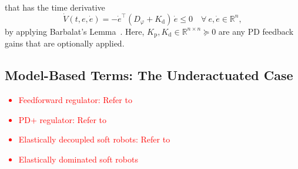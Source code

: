 that has the time derivative
\begin{equation}
    \dot{V}(t,e,\dot{e}) = -\dot{e}^\top \left (D_\varphi + K_\mathrm{d} \right ) \, \dot{e} \leq 0 \quad \forall \: e,\dot{e} \in \mathbb{R}^n,
\end{equation}
by applying Barbalat's Lemma~\citep{slotine1991applied, della2020model}.
Here, $K_\mathrm{p}, K_\mathrm{d} \in \mathbb{R}^{n \times n} \succeq 0$ are any PD feedback gains that are optionally applied.


\subsection{Model-Based Terms: The Underactuated Case}\label{sub:background:model_based_control:model_based_terms_underactuated}
\textcolor{red}{\begin{itemize}
    \item Feedforward regulator: Refer to \citep{pustina2025analysis}
    \item PD+ regulator: Refer to \citep{pustina2025analysis}
    \item Elastically decoupled soft robots: Refer to \citep{pustina2025analysis}
    \item Elastically dominated soft robots
\end{itemize}}


